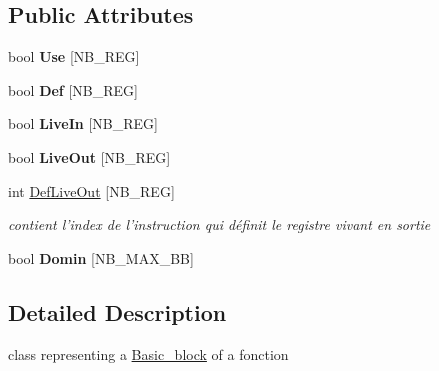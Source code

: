 \subsection*{Public Attributes}
\begin{DoxyCompactItemize}
\item 
\hypertarget{class_basic__block_a1a8d751c01628f35095a35d575beb222}{bool {\bfseries Use} \mbox{[}N\+B\+\_\+\+R\+E\+G\mbox{]}}\label{class_basic__block_a1a8d751c01628f35095a35d575beb222}

\item 
\hypertarget{class_basic__block_ae46ec94a0bd08844638d70c145fd56ab}{bool {\bfseries Def} \mbox{[}N\+B\+\_\+\+R\+E\+G\mbox{]}}\label{class_basic__block_ae46ec94a0bd08844638d70c145fd56ab}

\item 
\hypertarget{class_basic__block_a41faa67e5761077c1d21749740400fcb}{bool {\bfseries Live\+In} \mbox{[}N\+B\+\_\+\+R\+E\+G\mbox{]}}\label{class_basic__block_a41faa67e5761077c1d21749740400fcb}

\item 
\hypertarget{class_basic__block_a38ae01a57bdeffc1a5e1fca510ba231a}{bool {\bfseries Live\+Out} \mbox{[}N\+B\+\_\+\+R\+E\+G\mbox{]}}\label{class_basic__block_a38ae01a57bdeffc1a5e1fca510ba231a}

\item 
\hypertarget{class_basic__block_ab8a10607e6603dba67f5055d53745421}{int \hyperlink{class_basic__block_ab8a10607e6603dba67f5055d53745421}{Def\+Live\+Out} \mbox{[}N\+B\+\_\+\+R\+E\+G\mbox{]}}\label{class_basic__block_ab8a10607e6603dba67f5055d53745421}

\begin{DoxyCompactList}\small\item\em contient l'index de l'instruction qui définit le registre vivant en sortie \end{DoxyCompactList}\item 
\hypertarget{class_basic__block_a03026db897e97c48ee99b85d4e62137f}{bool {\bfseries Domin} \mbox{[}N\+B\+\_\+\+M\+A\+X\+\_\+\+B\+B\mbox{]}}\label{class_basic__block_a03026db897e97c48ee99b85d4e62137f}

\end{DoxyCompactItemize}


\subsection{Detailed Description}
class representing a \hyperlink{class_basic__block}{Basic\+\_\+block} of a fonction 


